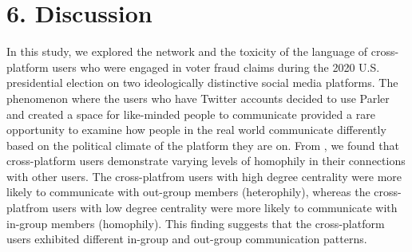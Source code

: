 \documentclass[Crown,sagev,times]{sagej}
\begin{document}
\section{6. Discussion}

In this study, we explored the network and the toxicity of the language of cross-platform users who were engaged in voter fraud claims during the 2020 U.S. presidential election on two ideologically distinctive social media platforms. 
The phenomenon where the users who have Twitter accounts decided to use Parler and created a space for like-minded people to communicate provided a rare opportunity to examine how people in the real world communicate differently based on the political climate of the platform they are on. From , we found that cross-platform users demonstrate varying levels of homophily in their connections with other users. The cross-platfrom users with high degree centrality were more likely to communicate with out-group members (heterophily), whereas the cross-platfrom users with low degree centrality were more likely to communicate with in-group members (homophily). This finding suggests that the cross-platform users exhibited different in-group and out-group communication patterns.
\end{document}
